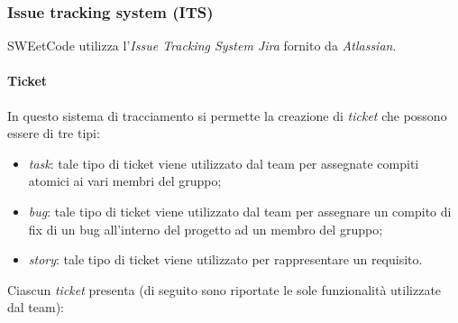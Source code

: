 \documentclass[10pt, a4paper]{article}
\begin{document}
\subsubsection{Issue tracking system (ITS)} %
SWEetCode utilizza l'\textit{Issue Tracking System Jira} fornito da \textit{Atlassian}.
\paragraph{Ticket}
In questo sistema di tracciamento si permette la creazione di \textit{ticket} che possono essere di tre tipi:
\begin{itemize}
    \item \textit{task}: tale tipo di ticket viene utilizzato dal team per assegnate compiti atomici ai vari membri del gruppo;
    \item \textit{bug}: tale tipo di ticket viene utilizzato dal team per assegnare un compito di fix di un bug all'interno del progetto ad un membro del gruppo; 
    \item \textit{story}: tale tipo di ticket viene utilizzato per rappresentare un requisito.
\end{itemize}
Ciascun \textit{ticket} presenta (di seguito sono riportate le sole funzionalità utilizzate dal team):
\end{document}
